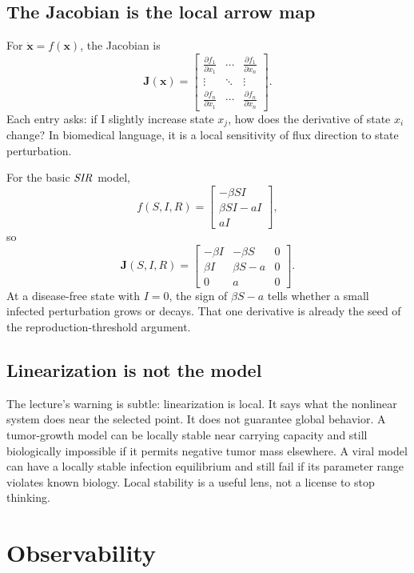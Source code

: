 \documentclass[a4paper]{article}
\newcommand{\vect}[1]{\boldsymbol{#1}}
\newcommand{\mat}[1]{\mathbf{#1}}
\newcommand{\J}{\mat J}
\newcommand{\SIR}{\ensuremath{\pksym{SIR}}}
\begin{document}
\subsection{The Jacobian is the local arrow map}

For \(\dot{\vect x}=f(\vect x)\), the Jacobian is
\[
  \J(\vect x)=
  \begin{bmatrix}
  \frac{\partial f_1}{\partial x_1} & \cdots & \frac{\partial f_1}{\partial x_n}\\
  \vdots & \ddots & \vdots\\
  \frac{\partial f_n}{\partial x_1} & \cdots & \frac{\partial f_n}{\partial x_n}
  \end{bmatrix}.
\]
Each entry asks: if I slightly increase state \(x_j\), how does the derivative of state \(x_i\) change? In biomedical language, it is a local sensitivity of flux direction to state perturbation.

For the basic \SIR{} model,
\[
  f(S,I,R)=
  \begin{bmatrix}
  -\beta SI\\
  \beta SI-aI\\
  aI
  \end{bmatrix},
\]
so
\[
  \J(S,I,R)=
  \begin{bmatrix}
  -\beta I & -\beta S & 0\\
  \beta I & \beta S-a & 0\\
  0 & a & 0
  \end{bmatrix}.
\]
At a disease-free state with \(I=0\), the sign of \(\beta S-a\) tells whether a small infected perturbation grows or decays. That one derivative is already the seed of the reproduction-threshold argument.

\subsection{Linearization is not the model}

The lecture's warning is subtle: linearization is local. It says what the nonlinear system does near the selected point. It does not guarantee global behavior. A tumor-growth model can be locally stable near carrying capacity and still biologically impossible if it permits negative tumor mass elsewhere. A viral model can have a locally stable infection equilibrium and still fail if its parameter range violates known biology. Local stability is a useful lens, not a license to stop thinking.

\section{Observability}
\end{document}
